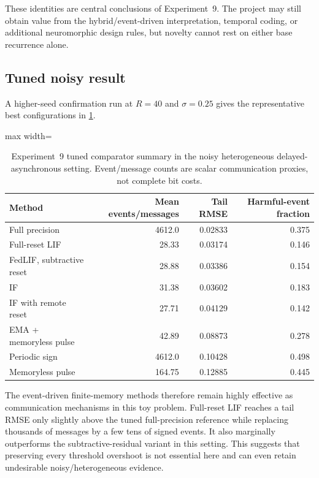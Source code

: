 These identities are central conclusions of Experiment~9. The project may still obtain value from the hybrid/event-driven interpretation, temporal coding, or additional neuromorphic design rules, but novelty cannot rest on either base recurrence alone.

\subsection{Tuned noisy result}

A higher-seed confirmation run at $R=40$ and $\sigma=0.25$ gives the representative best configurations in \cref{tab:exp9-noisy}.

\begin{table}[ht]
\centering
\caption{Experiment~9 tuned comparator summary in the noisy heterogeneous delayed-asynchronous setting. Event/message counts are scalar communication proxies, not complete bit costs.}
\label{tab:exp9-noisy}
\begin{adjustbox}{max width=\textwidth}
\begin{tabular}{lrrr}
\toprule
Method & Mean events/messages & Tail RMSE & Harmful-event fraction\\
\midrule
Full precision & 4612.0 & 0.02833 & 0.375\\
Full-reset LIF & 28.33 & 0.03174 & 0.146\\
FedLIF, subtractive reset & 28.88 & 0.03386 & 0.154\\
IF & 31.38 & 0.03602 & 0.183\\
IF with remote reset & 27.71 & 0.04129 & 0.142\\
EMA + memoryless pulse & 42.89 & 0.08873 & 0.278\\
Periodic sign & 4612.0 & 0.10428 & 0.498\\
Memoryless pulse & 164.75 & 0.12885 & 0.445\\
\bottomrule
\end{tabular}
\end{adjustbox}
\end{table}

The event-driven finite-memory methods therefore remain highly effective as communication mechanisms in this toy problem. Full-reset LIF reaches a tail RMSE only slightly above the tuned full-precision reference while replacing thousands of messages by a few tens of signed events. It also marginally outperforms the subtractive-residual variant in this setting. This suggests that preserving every threshold overshoot is not essential here and can even retain undesirable noisy/heterogeneous evidence.

